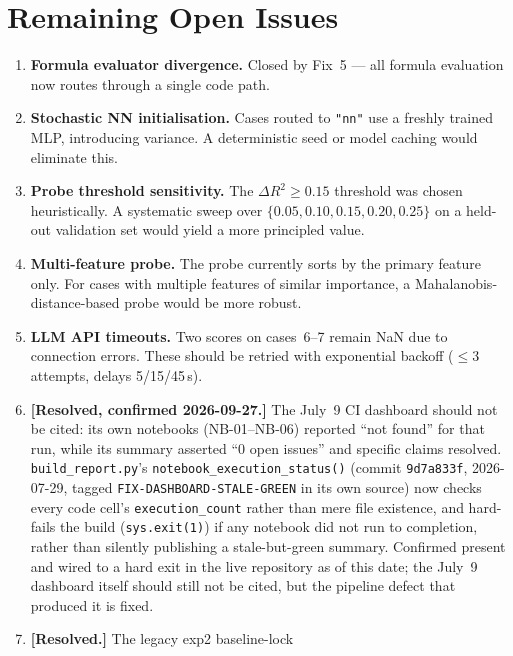 \documentclass[twoside,11pt]{article}
\begin{document}
\section{Remaining Open Issues}
\label{sec:open_issues}

\begin{enumerate}[leftmargin=*]
  \item \textbf{Formula evaluator divergence.}  Closed by Fix~5 — all formula
    evaluation now routes through a single code path.
  \item \textbf{Stochastic NN initialisation.}  Cases routed to \texttt{"nn"}
    use a freshly trained MLP, introducing variance.  A deterministic seed or
    model caching would eliminate this.
  \item \textbf{Probe threshold sensitivity.}  The $\Delta R^2 \geq 0.15$
    threshold was chosen heuristically.  A systematic sweep over
    $\{0.05, 0.10, 0.15, 0.20, 0.25\}$ on a held-out validation set would
    yield a more principled value.
  \item \textbf{Multi-feature probe.}  The probe currently sorts by the
    primary feature only.  For cases with multiple features of similar
    importance, a Mahalanobis-distance-based probe would be more robust.
  \item \textbf{LLM API timeouts.}  Two scores on cases~6--7 remain NaN
    due to connection errors.  These should be retried with exponential
    backoff ($\leq 3$ attempts, delays 5/15/45\,s).
  \item \textbf{[Resolved, confirmed 2026-09-27.]} The July~9 CI dashboard
    should not be cited: its own notebooks (NB-01--NB-06) reported ``not
    found'' for that run, while its summary asserted ``0 open issues''
    and specific claims resolved. \texttt{build\_report.py}'s
    \texttt{notebook\_execution\_status()} (commit \texttt{9d7a833f},
    2026-07-29, tagged \texttt{FIX-DASHBOARD-STALE-GREEN} in its own source)
    now checks every code cell's \texttt{execution\_count} rather than mere
    file existence, and hard-fails the build (\texttt{sys.exit(1)}) if any
    notebook did not run to completion, rather than silently publishing a
    stale-but-green summary. Confirmed present and wired to a hard exit in
    the live repository as of this date; the July~9 dashboard itself
    should still not be cited, but the pipeline defect that produced it
    is fixed.
  \item \textbf{[Resolved.]} The legacy exp2 baseline-lock

\end{enumerate}
\end{document}
